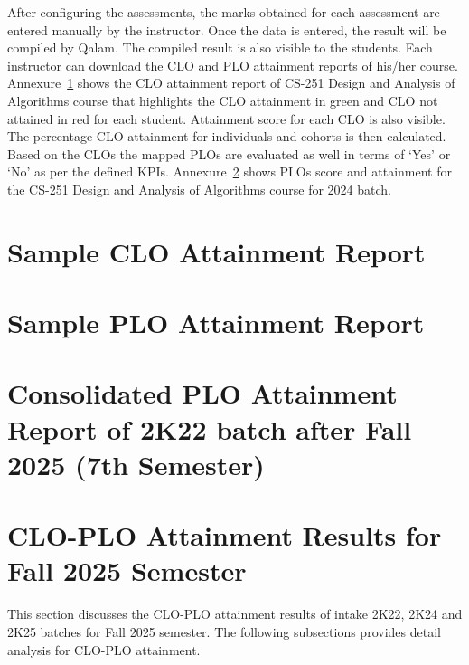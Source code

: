 {After configuring the assessments, the marks obtained for each assessment are entered manually by the instructor. Once the data is entered, the result will be compiled by Qalam. The compiled result is also visible to the students. Each instructor can download the CLO and PLO attainment reports of his/her course. Annexure~\ref{Sample CLO Attainment Report} shows the CLO attainment report of CS-251 Design and Analysis of Algorithms course that highlights the CLO attainment in green and CLO not attained in red for each student. Attainment score for each CLO is also visible. The percentage CLO attainment for individuals and cohorts is then calculated. Based on the CLOs the mapped PLOs are evaluated as well in terms of `Yes' or `No' as per the defined KPIs. Annexure~\ref{Sample PLO Attainment Report} shows PLOs score and attainment for the CS-251 Design and Analysis of Algorithms course for 2024 batch.

\section{Sample CLO Attainment Report}
\label{Sample CLO Attainment Report}


\section{Sample PLO Attainment Report}
\label{Sample PLO Attainment Report}


\section{Consolidated PLO Attainment Report of 2K22 batch after Fall 2025 (7th Semester)}
\label{Consolidated PLO Attainment Report}




\clearpage
\section{CLO-PLO Attainment Results for Fall 2025 Semester}
\label{annex:clo-plo-attainment-results}
This section discusses the CLO-PLO attainment results of intake 2K22, 2K24 and 2K25 batches for Fall 2025 semester. The following subsections provides detail analysis for CLO-PLO attainment.

}
